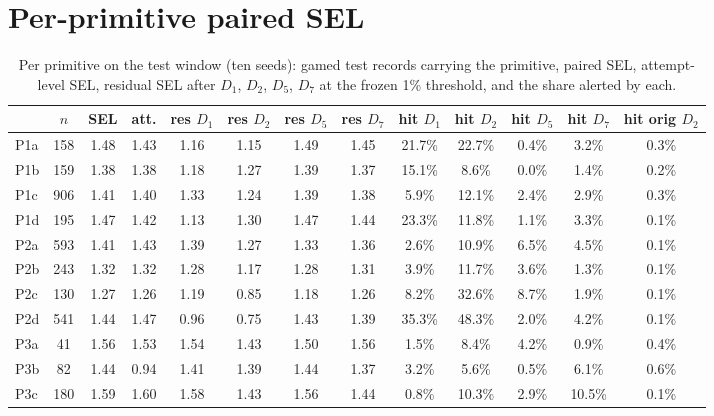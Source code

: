 \documentclass[conference]{IEEEtran}
\begin{document}
\section{Per-primitive paired SEL}
\begin{table}[t]\caption{Per primitive on the test window (ten seeds): gamed test records carrying the primitive, paired SEL, attempt-level SEL, residual SEL after $D_1$, $D_2$, $D_5$, $D_7$ at the frozen 1\% threshold, and the share alerted by each.}\label{tab:prims}\centering\scriptsize\setlength{\tabcolsep}{2.5pt}
\begin{tabular}{@{}lcccccccccccc@{}}\toprule
 & $n$ & SEL & att. & res $D_1$ & res $D_2$ & res $D_5$ & res $D_7$ & hit $D_1$ & hit $D_2$ & hit $D_5$ & hit $D_7$ & hit orig $D_2$ \\\midrule
P1a & 158 & 1.48 & 1.43 & 1.16 & 1.15 & 1.49 & 1.45 & 21.7\% & 22.7\% & 0.4\% & 3.2\% & 0.3\% \\
P1b & 159 & 1.38 & 1.38 & 1.18 & 1.27 & 1.39 & 1.37 & 15.1\% & 8.6\% & 0.0\% & 1.4\% & 0.2\% \\
P1c & 906 & 1.41 & 1.40 & 1.33 & 1.24 & 1.39 & 1.38 & 5.9\% & 12.1\% & 2.4\% & 2.9\% & 0.3\% \\
P1d & 195 & 1.47 & 1.42 & 1.13 & 1.30 & 1.47 & 1.44 & 23.3\% & 11.8\% & 1.1\% & 3.3\% & 0.1\% \\
P2a & 593 & 1.41 & 1.43 & 1.39 & 1.27 & 1.33 & 1.36 & 2.6\% & 10.9\% & 6.5\% & 4.5\% & 0.1\% \\
P2b & 243 & 1.32 & 1.32 & 1.28 & 1.17 & 1.28 & 1.31 & 3.9\% & 11.7\% & 3.6\% & 1.3\% & 0.1\% \\
P2c & 130 & 1.27 & 1.26 & 1.19 & 0.85 & 1.18 & 1.26 & 8.2\% & 32.6\% & 8.7\% & 1.9\% & 0.1\% \\
P2d & 541 & 1.44 & 1.47 & 0.96 & 0.75 & 1.43 & 1.39 & 35.3\% & 48.3\% & 2.0\% & 4.2\% & 0.1\% \\
P3a & 41 & 1.56 & 1.53 & 1.54 & 1.43 & 1.50 & 1.56 & 1.5\% & 8.4\% & 4.2\% & 0.9\% & 0.4\% \\
P3b & 82 & 1.44 & 0.94 & 1.41 & 1.39 & 1.44 & 1.37 & 3.2\% & 5.6\% & 0.5\% & 6.1\% & 0.6\% \\
P3c & 180 & 1.59 & 1.60 & 1.58 & 1.43 & 1.56 & 1.44 & 0.8\% & 10.3\% & 2.9\% & 10.5\% & 0.1\% \\
\bottomrule\end{tabular}\end{table}
\end{document}
